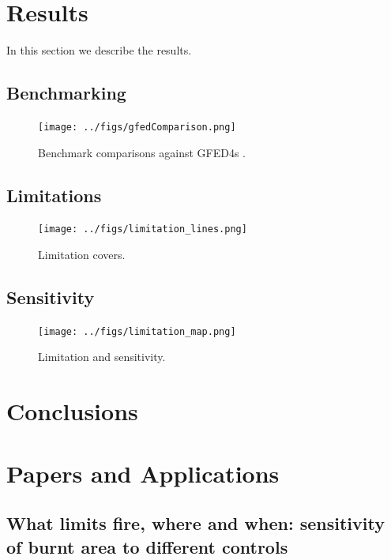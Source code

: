 \documentclass[12pt]{article}
\begin{document}
\section{Results}\label{results}
In this section we describe the results.

\subsection{Benchmarking}

\begin{figure}[!ht]
  \centering
    \texttt{[image: ../figs/gfedComparison.png]}
  \caption{Benchmark comparisons against GFED4s \citep{Giglio2013}.}
\end{figure}

\subsection{Limitations}

\begin{figure}[!ht]
  \centering
    \texttt{[image: ../figs/limitation\_lines.png]}

  \caption{Limitation covers.}
\end{figure}


\subsection{Sensitivity}

\begin{figure}[!ht]
  \centering
    \texttt{[image: ../figs/limitation\_map.png]}

  \caption{Limitation and sensitivity.}
\end{figure}

\section{Conclusions}\label{conclusions}

\section{Papers and Applications}

\subsection{What limits fire, where and when: sensitivity of burnt area to different controls}
\end{document}

